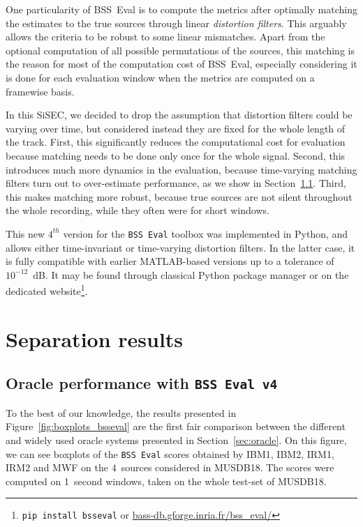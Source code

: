 \documentclass{llncs}
\begin{document}
One particularity of BSS~Eval is to compute the metrics after optimally matching the estimates to the true sources through linear \textit{distortion filters}. This arguably allows the criteria to be robust to some linear mismatches. Apart from the optional computation of all possible permutations of the sources, this matching is the reason for most of the computation cost of BSS~Eval, especially considering it is done for each evaluation window when the metrics are computed on a framewise basis.

In this SiSEC, we decided to drop the assumption that distortion filters could be varying over time, but considered instead they are fixed for the whole length of the track. First, this significantly reduces the computational cost for evaluation because matching needs to be done only once for the whole signal. Second, this introduces much more dynamics in the evaluation, because time-varying matching filters turn out to over-estimate performance, as we show in Section~\ref{ssec:bsseval-results}. Third, this makes matching more robust, because true sources are not silent throughout the whole recording, while they often were for short windows.

This new $4^{th}$ version for the \texttt{BSS~Eval} toolbox was implemented in Python, and allows either time-invariant or time-varying distortion filters. In the latter case, it is fully compatible with earlier MATLAB-based versions up to a tolerance of $10^{-12}$~dB. It may be found through classical Python package manager or on the dedicated website\footnote{\texttt{pip install bsseval} or \url{bass-db.gforge.inria.fr/bss_eval/}}.

\section{Separation results}
\subsection{Oracle performance with \texttt{BSS Eval v4}}
\label{ssec:bsseval-results}

To the best of our knowledge, the results presented in Figure~\ref{fig:boxplots_bsseval} are the first fair comparison between the different and widely used oracle systems presented in Section~\ref{sec:oracle}. On this figure, we can see boxplots of the \texttt{BSS~Eval} scores obtained by IBM1, IBM2, IRM1, IRM2 and MWF on the $4$~sources considered in MUSDB18. The scores were computed on 1~second windows, taken on the whole test-set of MUSDB18.
\end{document}
